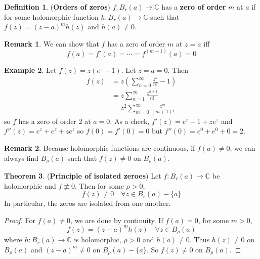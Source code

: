 \documentclass[12pt,a4paper]{article}
\theoremstyle{definition}
\newtheorem{definition}{Definition}[subsection]
\newtheorem{theorem}[definition]{Theorem}
\newtheorem{example}[definition]{Example}
\newtheorem*{remark}{Remark}
\begin{document}
\begin{definition}
	(\textbf{Orders of zeros}) $f: B_r(a) \rightarrow \mathbb{C}$ has a \textbf{zero of order} $m$ at $a$ if for some holomorphic function $h: B_r(a) \rightarrow \mathbb{C}$ such that $f(z) = {(z - a)}^m h(z)$ and $h(a) \ne 0$.
\end{definition}

\begin{remark}
	We can show that $f$ has a zero of order $m$ at $z = a$ iff
	\[
		f(a) = f'(a) = \cdots = f^{(m - 1)} (a) = 0
	\]
\end{remark}

\begin{example}
	Let $f(z) = z (e^z - 1)$. Let $z = a = 0$. Then
	\[
		\begin{aligned}
			f(z)
				& = z \left( \sum_{n=  0}^{\infty} \frac{z^n}{n!} - 1 \right) \\
				& = z \sum_{n = 1}^{\infty} \frac{z^{n + 1}}{n!} \\
				& = z^2 \sum_{m = 0}^{\infty} \frac{z^m}{(m + 1)!}
		\end{aligned}
	\]
	so $f$ has a zero of order $2$ at $a = 0$. As a check, $f'(z) = e^z - 1 + ze^z$ and $f''(z) = e^z + e^z + ze^z$ so $f(0) = f'(0) = 0$ but $f''(0) = e^0 + e^0 + 0 = 2$.
\end{example}

\begin{remark}
	Because holomorphic functions are continuous, if $f(a) \ne 0$, we can always find $B_{\rho} (a)$ such that $f(z) \ne 0$ on $B_{\rho}(a)$.
\end{remark}

\begin{theorem}
	(\textbf{Principle of isolated zeroes}) Let $f: B_r(a) \rightarrow \mathbb{C}$ be holomorphic and $f \not\equiv 0$. Then for some $\rho > 0$,
	\[
		f(z) \ne 0 \quad \forall z \in B_r(a) - \{ a \}
	\]
	In particular, the zeros are isolated from one another.
\end{theorem}

\begin{proof}
	For $f(a) \ne 0$, we are done by continuity. If $f(a) = 0$, for some $m > 0$,
	\[
		f(z) = {(z - a)}^m h(z) \quad \forall z \in B_{\rho}(a)
	\]
	where $h: B_r(a) \rightarrow \mathbb{C}$ is holomorphic, $\rho > 0$ and $h(a) \ne 0$. Thus $h(z) \ne 0$ on $B_{\rho}(a)$ and ${(z - a)}^m \ne 0$ on $B_{\rho} (a) - \{ a \}$. So $f(z) \ne 0$ on $B_{\rho}(a)$.
\end{proof}
\end{document}
